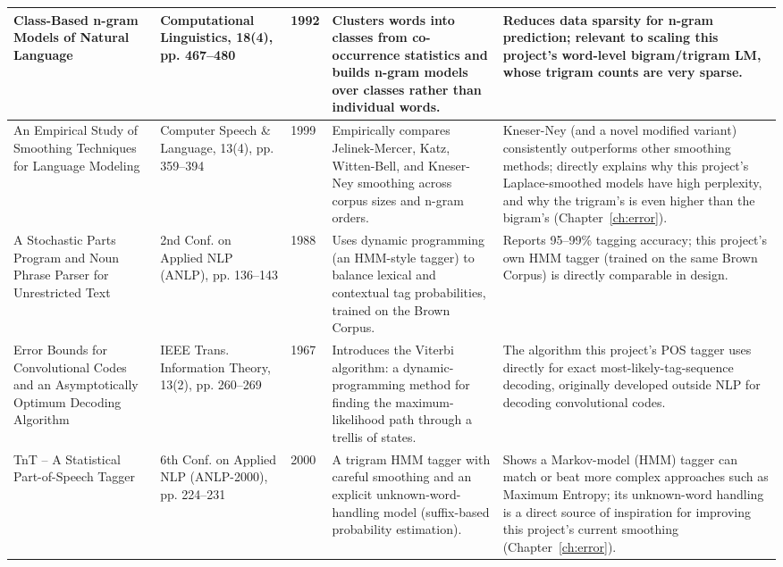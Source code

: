 \documentclass[12pt,a4paper]{report}
\begin{document}
\begin{longtable}{
|p{3.4cm}|p{2.6cm}|p{1.0cm}|p{3.2cm}|p{3.2cm}|
}
Class-Based n-gram Models of Natural Language &
Computational Linguistics, 18(4), pp. 467--480 &
1992 &
Clusters words into classes from co-occurrence statistics and builds
n-gram models over classes rather than individual words. &
Reduces data sparsity for n-gram prediction; relevant to scaling this
project's word-level bigram/trigram LM, whose trigram counts are very
sparse. \\
\hline

An Empirical Study of Smoothing Techniques for Language Modeling &
Computer Speech \& Language, 13(4), pp. 359--394 &
1999 &
Empirically compares Jelinek-Mercer, Katz, Witten-Bell, and Kneser-Ney
smoothing across corpus sizes and n-gram orders. &
Kneser-Ney (and a novel modified variant) consistently outperforms other
smoothing methods; directly explains why this project's
Laplace-smoothed models have high perplexity, and why the trigram's
is even higher than the bigram's (Chapter~\ref{ch:error}). \\
\hline

A Stochastic Parts Program and Noun Phrase Parser for Unrestricted Text &
2nd Conf. on Applied NLP (ANLP), pp. 136--143 &
1988 &
Uses dynamic programming (an HMM-style tagger) to balance lexical and
contextual tag probabilities, trained on the Brown Corpus. &
Reports 95--99\% tagging accuracy; this project's own HMM tagger (trained
on the same Brown Corpus) is directly comparable in design. \\
\hline

Error Bounds for Convolutional Codes and an Asymptotically Optimum
Decoding Algorithm &
IEEE Trans. Information Theory, 13(2), pp. 260--269 &
1967 &
Introduces the Viterbi algorithm: a dynamic-programming method for
finding the maximum-likelihood path through a trellis of states. &
The algorithm this project's POS tagger uses directly for exact
most-likely-tag-sequence decoding, originally developed outside NLP for
decoding convolutional codes. \\
\hline

TnT -- A Statistical Part-of-Speech Tagger &
6th Conf. on Applied NLP (ANLP-2000), pp. 224--231 &
2000 &
A trigram HMM tagger with careful smoothing and an explicit
unknown-word-handling model (suffix-based probability estimation). &
Shows a Markov-model (HMM) tagger can match or beat more complex
approaches such as Maximum Entropy; its unknown-word handling is a direct
source of inspiration for improving this project's current smoothing
(Chapter~\ref{ch:error}). \\
\hline

\end{longtable}
\normalsize
\end{document}
